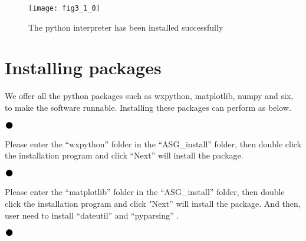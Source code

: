 \begin{figure}[ht]
\centering
\texttt{[image: fig3\_1\_0]}
\caption{The python interpreter has been installed successfully}
\end{figure}

\newpage
\section{\heiti Installing packages}
We offer all the python packages such as wxpython, matplotlib, numpy and six, to make the software runnable. Installing these packages can perform as below.
\vspace{0.3cm}

\noindent$\vcenter{\hbox{\huge$\bullet$}}$\quad\fontsize{12pt}{\baselineskip}\textbf{}

Please enter the “wxpython” folder in the “ASG\_install” folder, then double click the installation program and click “Next” will install the package.
\vspace{0.3cm}

\noindent$\vcenter{\hbox{\huge$\bullet$}}$\quad\fontsize{12pt}{\baselineskip}\textbf{ }

Please enter the “matplotlib” folder in the “ASG\_install” folder, then double click the installation program and click "Next” will install the package. And then, user need to install “dateutil” and “pyparsing” .
\vspace{0.3cm}

\noindent$\vcenter{\hbox{\huge$\bullet$}}$\quad\fontsize{12pt}{\baselineskip}\textbf{ }

